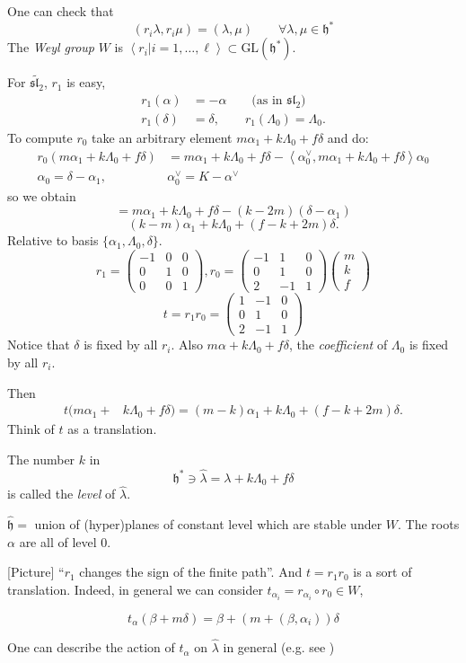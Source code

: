 One can check that
$$
(r_i\lambda,r_i\mu)=(\lambda,\mu)\qquad \forall \lambda,\mu \in \mathfrak{h}^*
$$
The {\it Weyl group} $W$ is $\left<r_i|i=1,\ldots,\ell\right>\subset 
\text{GL}(\mathfrak{h}^*)$.

\begin{example}
\label{example-Weyl-group-sl2tilde}
For $\widetilde{\mathfrak{sl}_2}$, $r_1$ is easy,
\begin{align*}
r_1(\alpha)&=-\alpha \qquad \text{(as in $\mathfrak{sl}_2$)}\\
r_1(\delta)&=\delta,\qquad r_1(\Lambda_0)=\Lambda_0.
\end{align*}
To compute $r_0$ take an arbitrary element $m \alpha_1+k\Lambda_0+f\delta$ and
do:
\begin{align*}
r_0(m \alpha_1+k\Lambda_0+f\delta)&=m\alpha_1+k\Lambda_0+f\delta
-\left<\alpha_0^\vee,m\alpha_1+k\Lambda_0+f\delta\right>\alpha_0\\
\alpha_0=\delta-\alpha_1,\qquad & \alpha_0^\vee=K-\alpha^\vee
\end{align*}
so we obtain
$$
=m\alpha_1+k\Lambda_0+f\delta-(k-2m)(\delta-\alpha_1)
$$
$$
(k-m)\alpha_1+k\Lambda_0+(f-k+2m)\delta.
$$
Relative to basis $\{\alpha_1,\Lambda_0,\delta\}$.
$$
r_1=\begin{pmatrix}
-1&0&0\\
0&1&0\\
0&0&1
\end{pmatrix},
r_0=\begin{pmatrix}
-1&1&0\\
0&1&0\\
2&-1&1
\end{pmatrix}
\begin{pmatrix}
m\\
k\\
f
\end{pmatrix}
$$
$$
t=r_1r_0=\begin{pmatrix}
1&-1&0\\
0&1&0\\
2&-1&1
\end{pmatrix}
$$
Notice that $\delta$ is fixed by all $r_i$. Also 
$m \alpha+k \Lambda_0 +f\delta$, the {\it coefficient} of $\Lambda_0$ is fixed
by all $r_i$.

Then
\begin{align*}
t(m\alpha_1+&k\Lambda_0+f\delta)=(m-k)\alpha_1+k\Lambda_0+(f-k+2m)\delta.
\end{align*}
Think of $t$ as a translation.

The number $k$ in 
 $$
\mathfrak{h}^* \ni \hat{\lambda}=\lambda+k\Lambda_0+f\delta
$$
is called the {\it level} of $\hat{\lambda}$.

$\hat{\mathfrak{h}}=$ union of (hyper)planes of constant level which are stable
under $W$. The roots $\alpha$ are all of level $0$.

[Picture] 
``$r_1$ changes the sign of the finite path''. And $t=r_1r_0$ is a sort of
translation. Indeed, in general we can consider 
$t_{\alpha_i}=r_{\alpha_i}\circ r_0 \in W$,

$$
t_\alpha(\beta+m\delta)=\beta+(m+(\beta,\alpha_i))\delta
$$
\end{example}
One can describe the action of $t_\alpha$ on $\hat{\lambda}$ in general 
(e.g. see \cite[Chapter 6]{IDLA})

